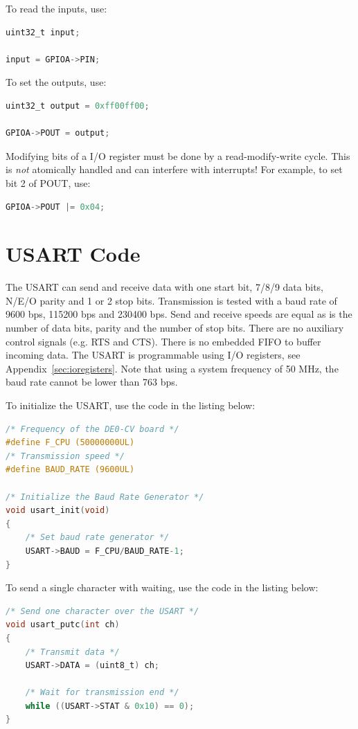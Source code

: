 \documentclass[12pt]{article}
\begin{document}
To read the inputs, use:

\begin{lstlisting}[language=C]
uint32_t input;

input = GPIOA->PIN;
\end{lstlisting}

To set the outputs, use:

\begin{lstlisting}[language=C]
uint32_t output = 0xff00ff00;

GPIOA->POUT = output;
\end{lstlisting}

Modifying bits of a I/O register must be done by a read-modify-write cycle. This is \emph{not} atomically handled and can interfere with interrupts! For example, to set bit 2 of POUT, use:

\begin{lstlisting}[language=C]
GPIOA->POUT |= 0x04;
\end{lstlisting}

\section{USART Code}

The USART can send and receive data with one start bit, 7/8/9 data bits, N/E/O parity and 1 or 2 stop bits. Transmission is tested with a baud rate of 9600 bps, 115200 bps and 230400 bps. Send and receive speeds are equal as is the number of data bits, parity and the number of stop bits. There are no auxiliary control signals (e.g. RTS and CTS). There is no embedded FIFO to buffer incoming data. The USART is programmable using I/O registers, see Appendix~\ref{sec:ioregisters}. Note that using a system frequency of 50 MHz, the baud rate cannot be lower than 763 bps.

To initialize the USART, use the code in the listing below:

\begin{lstlisting}[language=C]
/* Frequency of the DE0-CV board */
#define F_CPU (50000000UL)
/* Transmission speed */
#define BAUD_RATE (9600UL)

/* Initialize the Baud Rate Generator */
void usart_init(void)
{
    /* Set baud rate generator */
    USART->BAUD = F_CPU/BAUD_RATE-1;
}
\end{lstlisting}

To send a single character with waiting, use the code in the listing below:

\begin{lstlisting}[language=C]
/* Send one character over the USART */
void usart_putc(int ch)
{
    /* Transmit data */
    USART->DATA = (uint8_t) ch;
            
    /* Wait for transmission end */
    while ((USART->STAT & 0x10) == 0);
}
\end{lstlisting}
\end{document}
